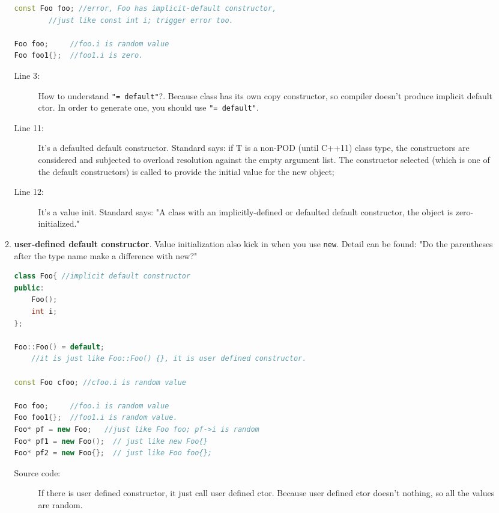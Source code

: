 \documentclass[a4paper,11pt,twoside]{book}
\begin{document}
\begin{itemize}
\begin{enumerate}
\begin{lstlisting}[frame=single, language=c++]
const Foo foo; //error, Foo has implicit-default constructor, 
		//just like const int i; trigger error too.
	
Foo foo;     //foo.i is random value
Foo foo1{};	 //foo1.i is zero.		 
\end{lstlisting}
\begin{description}			
	\item[Line 3:]  How to understand \texttt{"= default"}?. Because class has its own copy constructor, so compiler doesn't produce implicit default ctor. In order to generate one, you should use \texttt{"= default"}.
	
	\item[Line 11:] It's a defaulted default constructor.  Standard says: if T is a non-POD (until C++11) class type, the constructors are considered and subjected to overload resolution against the empty argument list. The constructor selected (which is one of the default constructors) is called to provide the initial value for the new object;
	
	\item[Line 12:] It's a value init. Standard says: "A class with an implicitly-defined or defaulted default constructor, the object is zero-initialized."
\end{description}


		\item \textbf{user-defined default constructor}. Value initialization also kick in when you use \texttt{new}. Detail can be found: "Do the parentheses after the type name make a difference with new?"
\begin{lstlisting}[frame=single, language=c++]
class Foo{ //implicit default constructor
public:
	Foo();
	int i;
};

Foo::Foo() = default; 
    //it is just like Foo::Foo() {}, it is user defined constructor.
			
const Foo cfoo; //cfoo.i is random value 
			
Foo foo;     //foo.i is random value
Foo foo1{};	 //foo1.i is random value.	
Foo* pf = new Foo;   //just like Foo foo; pf->i is random 
Foo* pf1 = new Foo();  // just like new Foo{}
Foo* pf2 = new Foo{};  // just like Foo foo{};		 
\end{lstlisting}
\begin{description}			
	\item[Source code:] If there is user defined constructor, it just call user defined ctor. Because user defined ctor doesn't nothing, so all the values are random.
\end{description}


\end{enumerate}
\end{itemize}
\end{document}
